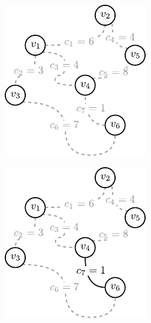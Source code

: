 \begin{figure}[!htbp]
	\hspace{3pt}
	\begin{subfigure}[b]{0.19\textwidth}
		\includegraphics[width=\textwidth]{Chapter_I/KRUSKAL-example/a}
		\caption{}
		\label{fig:kruskal:a}
	\end{subfigure}
	\hfill
	\begin{subfigure}[b]{0.19\textwidth}
		\includegraphics[width=\textwidth]{Chapter_I/KRUSKAL-example/b}

\end{subfigure}
\end{figure}
